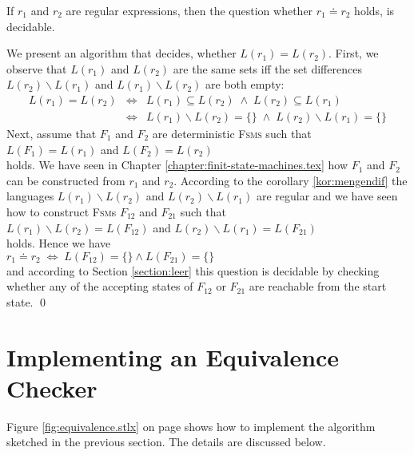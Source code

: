 \begin{Theorem}
  If $r_1$ and $r_2$ are regular expressions, then the question whether $r_1 \doteq r_2$ holds, is decidable.
\end{Theorem}

\proofEng
We present an algorithm that decides, whether $L(r_1) = L(r_2)$.  First, we observe that 
$L(r_1)$ and $L(r_2)$ are the same sets iff the set differences $L(r_2) \backslash L(r_1)$ and $L(r_1) \backslash L(r_2)$
are both empty:
\begin{eqnarray*}
                  L(r_1) = L(r_2) 
&\Leftrightarrow& L(r_1) \subseteq L(r_2)         \;\wedge\; L(r_2) \subseteq L(r_1)          \\
&\Leftrightarrow& L(r_1) \backslash L(r_2) = \{\} \;\wedge\; L(r_2) \backslash L(r_1) = \{\}  
\end{eqnarray*}
Next, assume that $F_1$ and $F_2$ are deterministic \textsc{Fsms} such that
\\[0.2cm]
\hspace*{1.3cm}
$L(F_1) = L(r_1)$ \quad and \quad $L(F_2) = L(r_2)$
\\[0.2cm]
holds.  We have seen in Chapter \ref{chapter:finit-state-machines.tex} how $F_1$ and $F_2$ can be
constructed from $r_1$ and $r_2$. According to the corollary \ref{kor:mengendif} the languages
$L(r_1) \backslash L(r_2)$ and $L(r_2) \backslash L(r_1)$ are regular and we have seen how to
construct \textsc{Fsm}s $F_{12}$ and $F_{21}$ such that
\\[0.2cm]
\hspace*{1.3cm}
$L(r_1) \backslash L(r_2) = L(F_{12})$ \quad and \quad $L(r_2) \backslash L(r_1) = L(F_{21})$ 
\\[0.2cm]
holds.  Hence we have
\\[0.2cm]
\hspace*{1.3cm}
$r_1 \doteq r_2 \;\Leftrightarrow\; L(F_{12}) = \{\} \wedge  L(F_{21}) = \{\}$
\\[0.2cm]
and according to Section \ref{section:leer} this question is decidable by checking whether any of
the accepting states of $F_{12}$ or $F_{21}$ are reachable from the start state.
\qed

\section{Implementing an Equivalence Checker}
Figure \ref{fig:equivalence.stlx} on page \pageref{fig:equivalence.stlx} shows how to
implement the algorithm sketched in the previous section.  The details are discussed
below.

